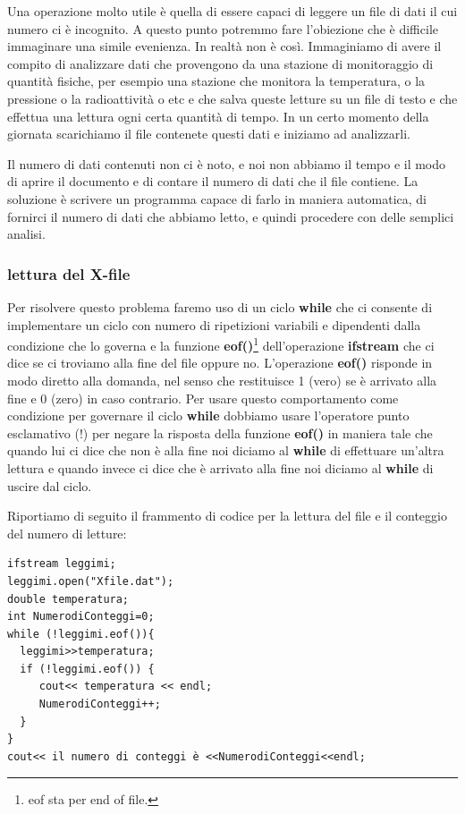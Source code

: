 \documentclass[11pt,fleqn]{book} %
\begin{document}
Una operazione molto utile è quella di essere capaci di leggere un file di dati il cui numero ci è incognito. A questo punto potremmo fare l'obiezione che è difficile immaginare una simile evenienza. In realtà non è così. Immaginiamo di avere il compito di analizzare dati che provengono da una stazione di monitoraggio di quantità fisiche, per esempio una stazione che monitora la temperatura, o la pressione o la radioattività o etc e che salva queste letture su un file di testo e che effettua una lettura ogni certa quantità di tempo.
In un certo momento della giornata scarichiamo il file contenete questi dati e iniziamo ad analizzarli.

Il numero di dati contenuti non ci è noto, e noi non abbiamo il tempo e il modo di aprire il documento e di contare il numero di dati che il file contiene. La soluzione è scrivere un programma capace di farlo in maniera automatica, di fornirci il numero di dati che abbiamo letto, e quindi procedere con delle semplici analisi.

\subsubsection{lettura del X-file}

Per risolvere questo problema faremo uso di un ciclo \textbf{while} che ci consente di implementare un ciclo con numero di ripetizioni variabili e dipendenti dalla condizione che lo governa e la funzione \textbf{eof()}\footnote{eof sta per end of file.} dell'operazione \textbf{ifstream} che ci dice se ci troviamo alla fine del file oppure no. L'operazione \textbf{eof()} risponde in modo diretto alla domanda, nel senso che restituisce 1 (vero) se è arrivato alla fine e 0 (zero)  in caso contrario. Per usare questo comportamento come condizione per governare il ciclo \textbf{while} dobbiamo usare l'operatore punto esclamativo (!) per negare la risposta della funzione \textbf{eof()} in maniera tale che quando lui ci dice che non è alla fine noi diciamo al \textbf{while} di effettuare un'altra lettura e quando invece ci dice che è arrivato alla fine noi diciamo al \textbf{while} di uscire dal ciclo.

Riportiamo di seguito il frammento di codice per la lettura del file e il conteggio del numero di letture:

\begin{verbatim}
ifstream leggimi;
leggimi.open("Xfile.dat");
double temperatura;
int NumerodiConteggi=0;
while (!leggimi.eof()){
  leggimi>>temperatura;
  if (!leggimi.eof()) {
     cout<< temperatura << endl;
     NumerodiConteggi++;
  }
}
cout<< il numero di conteggi è <<NumerodiConteggi<<endl;
\end{verbatim}
\end{document}
